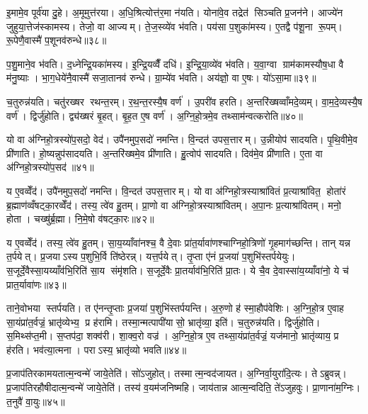 इ॒मामे॒व पूर्व॑या दु॒हे। अ॒मूमुत्त॑रया। अ॒धि॒श्रित्योत्त॑र॒मा न॑यति। योना॑वे॒व तद्रेत॑ सिञ्चति प्र॒जन॑ने। आज्ये॑न जुहुया॒त्तेज॑स्कामस्य। तेजो॒ वा आज्यम्। ते॒ज॒स्व्ये॑व भ॑वति। पय॑सा प॒शुका॑मस्य। ए॒तद्वै प॑शू॒ना रू॒पम्। रू॒पेणै॒वास्मै॑ प॒शूनव॑रुन्धे॥३८॥

प॒शु॒माने॒व भ॑वति। द॒ध्नेन्द्रि॒यका॑मस्य। इ॒न्द्रि॒यव्वैँ दधि॑। इ॒न्द्रि॒या॒व्ये॑व भ॑वति। य॒वा॒ग्वा ग्राम॑कामस्यौष॒धा वै म॑नु॒ष्याः। भा॒ग॒धेये॑नै॒वास्मै॑ सजा॒तानव॑ रुन्धे। ग्रा॒म्ये॑व भ॑वति। अय॑ज्ञो॒ वा ए॒षः। यो॑ऽसा॒मा॥३९॥

च॒तुरुन्न॑यति। चतु॑रख्षर रथन्त॒रम्। र॒थ॒न्त॒रस्यै॒ष वर्ण॑। उ॒परी॑व हरति। अ॒न्तरि॑ख्षव्वाँमदे॒व्यम्। वा॒म॒दे॒व्यस्यै॒ष वर्ण॑। द्विर्जु॑होति। द्व्य॑ख्षरं बृ॒हत्। बृ॒ह॒त ए॒ष वर्ण॑। अ॒ग्नि॒हो॒त्रमे॒व तथ्साम॑न्वत्करोति॥४०॥

यो वा अ॑ग्निहो॒त्रस्यो॑प॒सदो॒ वेद॑। उपै॑नमुप॒सदो॑ नमन्ति। वि॒न्दत॑ उपस॒त्तारम्। उ॒न्नीयोप॑ सादयति। पृ॒थि॒वीमे॒व प्री॑णाति। हो॒ष्यन्नुप॑सादयति। अ॒न्तरि॑ख्षमे॒व प्री॑णाति। हु॒त्वोप॑ सादयति। दिव॑मे॒व प्री॑णाति। ए॒ता वा अ॑ग्निहो॒त्रस्यो॑प॒सद॑॥४१॥

य ए॒वव्वेँद॑। उपै॑नमुप॒सदो॑ नमन्ति। वि॒न्दत॑ उपस॒त्तारम्। यो वा अ॑ग्निहो॒त्रस्याश्रा॑वितं प्र॒त्याश्रा॑वित॒ होता॑रं ब्र॒ह्माण॑व्वँषट्का॒रव्वेँद॑। तस्य॒ त्वे॑व हु॒तम्। प्रा॒णो वा अ॑ग्निहो॒त्रस्याश्रा॑वितम्। अ॒पा॒नः प्र॒त्याश्रा॑वितम्। मनो॒ होता। चख्षु॑र्ब्र॒ह्मा। नि॒मे॒षो व॑षट्का॒रः॥४२॥

य ए॒वव्वेँद॑। तस्य॒ त्वे॑व हु॒तम्। सा॒य॒य्याँवा॑नश्च॒ वै दे॒वाः प्रा॑त॒र्यावा॑णश्चाग्निहो॒त्रिणो॑ गृ॒हमाग॑च्छन्ति। तान् यन्न त॒र्पयेत्। प्र॒जयाऽस्य प॒शुभि॒र्वि ति॑ष्ठेरन्न्। यत्त॒र्पयेत्। तृ॒प्ता ए॑नं प्र॒जया॑ प॒शुभि॑स्तर्पयेयुः। स॒जूर्दे॒वैस्सा॒यय्याँव॑भि॒रिति॑ सा॒य संमृ॑शति। स॒जूर्दे॒वैः प्रा॒तर्याव॑भि॒रिति॑ प्रा॒तः। ये चै॒व दे॒वास्सा॑य॒य्याँवा॑नो॒ ये च॑ प्रात॒र्यावा॑णः॥४३॥

ताने॒वोभया स्तर्पयति। त ए॑नन्तृ॒प्ताः प्र॒जया॑ प॒शुभि॑स्तर्पयन्ति। अ॒रु॒णो ह॑ स्मा॒हौप॑वेशिः। अ॒ग्नि॒हो॒त्र ए॒वाह सा॒यंप्रा॑त॒र्वज्रं॒ भ्रातृ॑व्येभ्य॒ प्र ह॑रामि। तस्मा॒न्मत्पापी॑यासो॒ भ्रातृ॑व्या॒ इति॑। च॒तुरुन्न॑यति। द्विर्जु॑होति। स॒मिथ्स॑प्त॒मी। स॒प्तप॑दा॒ शक्व॑री। शा॒क्व॒रो वज्र॑। अ॒ग्नि॒हो॒त्र ए॒व तथ्सा॒यंप्रा॑त॒र्वज्रं॒ यज॑मानो॒ भ्रातृ॑व्याय॒ प्र ह॑रति। भव॑त्या॒त्मना। पराऽस्य॒ भ्रातृ॑व्यो भवति॥४४॥

प्र॒जाप॑तिरकामयतात्म॒न्वन्मे॑ जाये॒तेति॑। सो॑ऽजुहोत्। तस्मात्म॒न्वद॑जायत। अ॒ग्निर्वा॒युरा॑दि॒त्यः। तेऽब्रुवन्न्। प्र॒जाप॑तिरहौषीदात्म॒न्वन्मे॑ जाये॒तेति॑। तस्य॑ व॒यम॑जनिष्महि। जाय॑तान्न आत्म॒न्वदिति॒ ते॑ऽजुहवुः। प्रा॒णाना॑म॒ग्निः। त॒नुवै॑ वा॒युः॥४५॥

